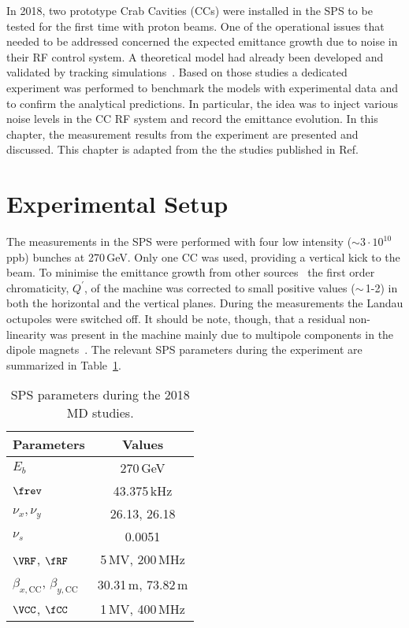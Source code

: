In 2018, two prototype Crab Cavities (CCs) were installed in the SPS to be tested for the first time with proton beams. One of the operational issues that needed to be addressed concerned the expected emittance growth due to noise in their RF control system. A theoretical model had already been developed
and validated by tracking simulations~\cite{PhysRevSTAB.18.101001}. Based on those studies a dedicated experiment was performed to benchmark the models with experimental data and to confirm the analytical predictions. In particular, the idea was to inject various noise levels in the CC RF system and record
 the emittance evolution. In this chapter, the measurement results from the experiment are presented and discussed. This chapter is adapted from the the studies published in Ref.~\cite{Triantafyllou}

 \section{Experimental Setup} %

The measurements in the SPS were performed with four low intensity ($\sim 3 \cdot 10^{10}$\, ppb) bunches at 270\,GeV. Only one CC was used, providing a vertical kick to the beam. To minimise the emittance growth from other sources~\cite{Antoniou:2649815} the first order chromaticity, $Q^\prime$, of the machine was corrected to small positive values ($\sim$\,1-2) in both the horizontal and the vertical planes. During the measurements the Landau octupoles were switched off. It should be note, though, that a residual non-linearity was present in the machine mainly due to multipole components in the dipole magnets~\cite{Carlà:2664976, Alekou:2640326}. The relevant SPS parameters during the experiment are summarized in Table~\ref{tab:SPS_MD_params}. 

\begin{table}[!hbt]
    \centering
    \caption{SPS parameters during the 2018 MD studies.}
    \begin{tabular}{lc}
        \toprule
        \textbf{Parameters} & \textbf{Values}\\
        \midrule
           $E_b$  & 270\,GeV   \\ %
           $\frev$  & 43.375\,kHz  \\ %
           $\nu_x, \nu_y$    & 26.13, 26.18  \\ %
            $\nu_s$ & 0.0051   \\
            $\VRF$, $\fRF$ & 5\,MV, 200\,MHz \\
            $\beta_{x, \text{CC}}$, $\beta_{y,\text{CC}}$ &  30.31\,m, 73.82\,m \\
            $\VCC$, $\fCC$ & 1\,MV, 400\,MHz \\
       \bottomrule
    \end{tabular}
    \label{tab:SPS_MD_params}
 \end{table}